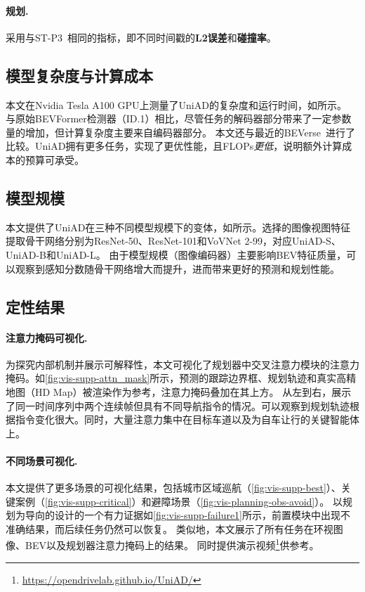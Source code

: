 \documentclass[10pt,twocolumn,letterpaper]{article}
\newcommand{\algname}{{{UniAD}}\xspace}
\begin{document}
\paragraph{规划.} 采用与ST-P3~\cite{hu2022stp3}相同的指标，即不同时间戳的\textbf{L2误差}和\textbf{碰撞率}。


\subsection{模型复杂度与计算成本}
本文在Nvidia Tesla A100 GPU上测量了UniAD的复杂度和运行时间，如所示。
%
与原始BEVFormer检测器（ID.1）相比，尽管任务的解码器部分带来了一定参数量的增加，但计算复杂度主要来自编码器部分。
%
本文还与最近的BEVerse~\cite{zhang2022beverse}进行了比较。UniAD拥有更多任务，实现了更优性能，且FLOPs\textit{更低}，说明额外计算成本的预算可承受。




\subsection{模型规模}
\label{sec:exp-sota2}
本文提供了UniAD在三种不同模型规模下的变体，如所示。选择的图像视图特征提取骨干网络分别为ResNet-50\cite{he2016resnet}、ResNet-101和VoVNet 2-99\cite{lee2019vovnet}，对应\algname-S、\algname-B和\algname-L。
%
由于模型规模（图像编码器）主要影响BEV特征质量，可以观察到感知分数随骨干网络增大而提升，进而带来更好的预测和规划性能。

\subsection{定性结果}
\label{sec:exp-qualitative}

\paragraph{注意力掩码可视化.} 为探究内部机制并展示可解释性，本文可视化了规划器中交叉注意力模块的注意力掩码。如\cref{fig:vis-supp-attn_mask}所示，预测的跟踪边界框、规划轨迹和真实高精地图（HD Map）被渲染作为参考，注意力掩码叠加在其上方。
%
从左到右，展示了同一时间序列中两个连续帧但具有不同导航指令的情况。可以观察到规划轨迹根据指令变化很大。同时，大量注意力集中在目标车道以及为自车让行的关键智能体上。

\paragraph{不同场景可视化.}
本文提供了更多场景的可视化结果，包括城市区域巡航（\cref{fig:vis-supp-best}）、关键案例（\cref{fig:vis-supp-critical}）和避障场景（\cref{fig:vis-planning-obs-avoid}）。
%
以规划为导向的设计的一个有力证据如\cref{fig:vis-supp-failure1}所示，前置模块中出现不准确结果，而后续任务仍然可以恢复。
%
类似地，本文展示了所有任务在环视图像、BEV以及规划器注意力掩码上的结果。
%
同时提供演示视频\footnote{\url{https://opendrivelab.github.io/UniAD/}}供参考。
\end{document}
